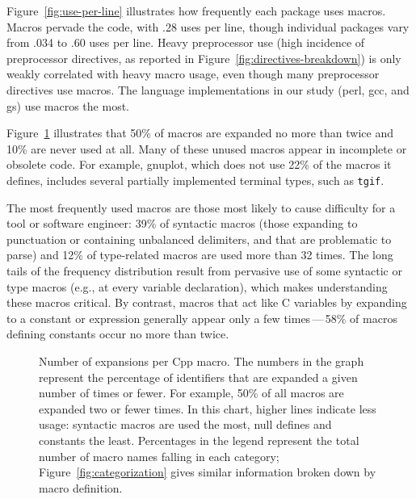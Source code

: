 \documentclass[10pt]{article}
\newcommand{\pkg}[1]{\textsf{#1}}
\newcommand{\captionsmall}[1]{\caption[]{\small #1}}
\begin{document}

Figure~\ref{fig:use-per-line} illustrates how frequently each package uses
macros.  Macros pervade the code, with .28 uses per line, though
individual packages vary from .034 to .60 uses per line.  Heavy preprocessor
use (high incidence of preprocessor directives, as reported in
Figure~\ref{fig:directives-breakdown}) is only weakly correlated with
heavy macro usage, even though many preprocessor directives use macros.
The language implementations in our study (\pkg{perl}, \pkg{gcc}, and
\pkg{gs}) use macros the most.


Figure~\ref{fig:freq-use-cat} illustrates that 50\% of macros are expanded
no more than twice and 10\% are never used at all.  Many of these unused
macros appear in incomplete or obsolete code.  For example, \pkg{gnuplot},
which does not use 22\% of the macros it defines, includes several
partially implemented terminal types, such as {\tt tgif}.



The most frequently used macros are those most likely to cause difficulty
for a tool or software engineer:  39\% of syntactic macros (those expanding
to punctuation or containing unbalanced delimiters, and that are
problematic to parse) and 12\% of type-related macros are used more than 32
times.  The long tails of the frequency distribution result from pervasive
use of some syntactic or type macros (e.g., at every variable declaration),
which makes understanding these macros critical.  By contrast, macros that
act like C variables by expanding to a constant or expression generally
appear only a few times\,---\,58\% of macros defining constants occur no
more than twice.


\begin{figure}
\centerline{}
\captionsmall{Number of expansions per Cpp macro.  The numbers in the
  graph represent the percentage of identifiers that are expanded a given
  number of times or fewer.  For example, 50\% of all macros are expanded
  two or fewer times.  In this chart, higher lines indicate less usage:
  syntactic macros are used the most, null defines and constants the least.
  Percentages in the legend represent the total number of
  macro names falling in each category; Figure~\ref{fig:categorization}
  gives similar information broken down by macro definition.}
\label{fig:freq-use-cat}
\end{figure}
\end{document}
